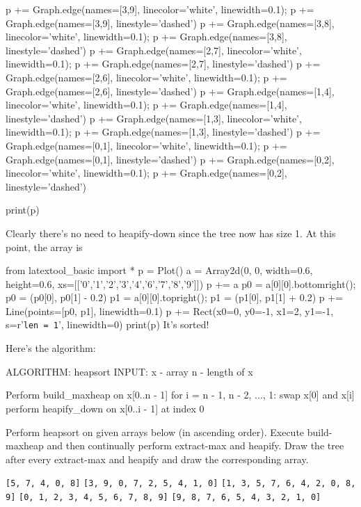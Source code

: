 p += Graph.edge(names=[3,9], linecolor='white', linewidth=0.1); p += Graph.edge(names=[3,9], linestyle='dashed')
p += Graph.edge(names=[3,8], linecolor='white', linewidth=0.1); p += Graph.edge(names=[3,8], linestyle='dashed')
p += Graph.edge(names=[2,7], linecolor='white', linewidth=0.1); p += Graph.edge(names=[2,7], linestyle='dashed')
p += Graph.edge(names=[2,6], linecolor='white', linewidth=0.1); p += Graph.edge(names=[2,6], linestyle='dashed')
p += Graph.edge(names=[1,4], linecolor='white', linewidth=0.1); p += Graph.edge(names=[1,4], linestyle='dashed')
p += Graph.edge(names=[1,3], linecolor='white', linewidth=0.1); p += Graph.edge(names=[1,3], linestyle='dashed')
p += Graph.edge(names=[0,1], linecolor='white', linewidth=0.1); p += Graph.edge(names=[0,1], linestyle='dashed')
p += Graph.edge(names=[0,2], linecolor='white', linewidth=0.1); p += Graph.edge(names=[0,2], linestyle='dashed')

print(p)

Clearly there's no need to heapify-down since the tree now has size 1.
At this point, the array is

from latextool_basic import *
p = Plot()
a = Array2d(0, 0, width=0.6, height=0.6, 
             xs=[['0','1','2','3','4','6','7','8','9']])
p += a
p0 = a[0][0].bottomright(); p0 = (p0[0], p0[1] - 0.2)
p1 = a[0][0].topright(); p1 = (p1[0], p1[1] + 0.2)
p += Line(points=[p0, p1], linewidth=0.1)
p += Rect(x0=0, y0=-1, x1=2, y1=-1, s=r'\texttt{len = 1}', linewidth=0) 
print(p)
It's sorted!

Here's the algorithm:
\begin{console}
ALGORITHM: heapsort
INPUT:     x - array
           n - length of x

Perform build_maxheap on x[0..n - 1]
for i = n - 1, n - 2, ..., 1: 
    swap x[0] and x[i]
    perform heapify_down on x[0..i - 1] at index 0
\end{console}

\newpage
\begin{ex}
Perform heapsort on given arrays below (in ascending order).
Execute build-maxheap and then continually perform
extract-max and heapify.
Draw the tree after every extract-max and heapify and draw the
corresponding array.
\begin{tightlist}
  \li \verb![5, 7, 4, 0, 8]!
  \li \verb![3, 9, 0, 7, 2, 5, 4, 1, 0]!
  \li \verb![1, 3, 5, 7, 6, 4, 2, 0, 8, 9]!
  \li \verb![0, 1, 2, 3, 4, 5, 6, 7, 8, 9]!
  \li \verb![9, 8, 7, 6, 5, 4, 3, 2, 1, 0]!
\end{tightlist}
\end{ex}

